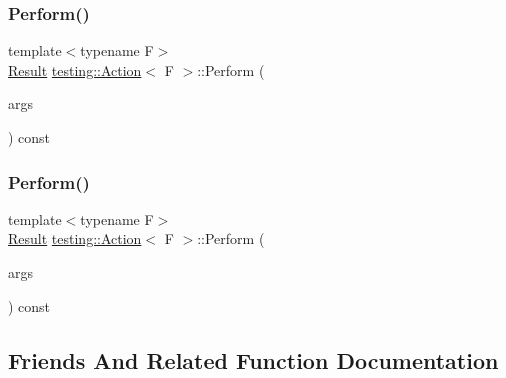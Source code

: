 \mbox{\label{classtesting_1_1_action_a5489a68def1d82eb61df819eae52dc8f}} 
\subsubsection{\texorpdfstring{Perform()}{Perform()}\hspace{0.1cm}{\footnotesize\ttfamily [2/3]}}
{\footnotesize\ttfamily template$<$typename F$>$ \\
\mbox{\hyperlink{classtesting_1_1_action_a9af08a21ad329331fde856cba9b6dea2}{Result}} \mbox{\hyperlink{classtesting_1_1_action}{testing\+::\+Action}}$<$ F $>$\+::Perform (\begin{DoxyParamCaption}\item[{\mbox{\hyperlink{classtesting_1_1_action_ae27fda510696a9294f991de5b1abfaf2}{Argument\+Tuple}}}]{args }\end{DoxyParamCaption}) const\hspace{0.3cm}{\ttfamily [inline]}}

\mbox{\label{classtesting_1_1_action_a5489a68def1d82eb61df819eae52dc8f}} 
\subsubsection{\texorpdfstring{Perform()}{Perform()}\hspace{0.1cm}{\footnotesize\ttfamily [3/3]}}
{\footnotesize\ttfamily template$<$typename F$>$ \\
\mbox{\hyperlink{classtesting_1_1_action_a9af08a21ad329331fde856cba9b6dea2}{Result}} \mbox{\hyperlink{classtesting_1_1_action}{testing\+::\+Action}}$<$ F $>$\+::Perform (\begin{DoxyParamCaption}\item[{\mbox{\hyperlink{classtesting_1_1_action_ae27fda510696a9294f991de5b1abfaf2}{Argument\+Tuple}}}]{args }\end{DoxyParamCaption}) const\hspace{0.3cm}{\ttfamily [inline]}}



\subsection{Friends And Related Function Documentation}
\mbox{\label{classtesting_1_1_action_a62bc48ff11968b6e45d21c4b49f349fb}} 
